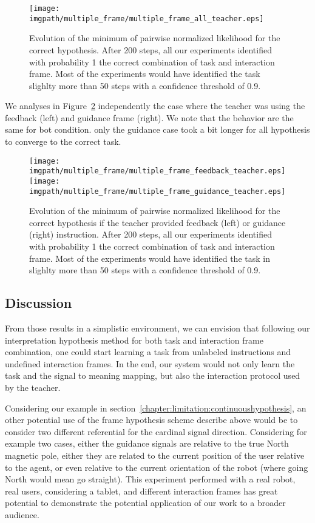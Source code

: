 \begin{figure}[!ht]
\centering
\texttt{[image: \\imgpath/multiple\_frame/multiple\_frame\_all\_teacher.eps]}
\caption{Evolution of the minimum of pairwise normalized likelihood for the correct hypothesis. After 200 steps, all our experiments identified with probability 1 the correct combination of task and interaction frame. Most of the experiments would have identified the task slighlty more than 50 steps with a confidence threshold of 0.9.}
\label{fig:multipleframeall}
\end{figure} 

We analyses in Figure~\ref{fig:multipleframefeedbackvsguidance} independently the case where the teacher was using the feedback (left) and guidance frame (right). We note that the behavior are the same for bot condition. only the guidance case took a bit longer for all hypothesis to converge to the correct task.

\begin{figure}[!ht]
\centering
\texttt{[image: \\imgpath/multiple\_frame/multiple\_frame\_feedback\_teacher.eps]}
\texttt{[image: \\imgpath/multiple\_frame/multiple\_frame\_guidance\_teacher.eps]}
\caption{Evolution of the minimum of pairwise normalized likelihood for the correct hypothesis if the teacher provided feedback (left) or guidance (right) instruction. After 200 steps, all our experiments identified with probability 1 the correct combination of task and interaction frame. Most of the experiments would have identified the task in slighlty more than 50 steps with a confidence threshold of 0.9.}
\label{fig:multipleframefeedbackvsguidance}
\end{figure} 


\subsection{Discussion}

From those results in a simplistic environment, we can envision that following our interpretation hypothesis method for both task and interaction frame combination, one could start learning a task from unlabeled instructions and undefined interaction frames. In the end, our system would not only learn the task and the signal to meaning mapping, but also the interaction protocol used by the teacher.

Considering our example in section~\ref{chapter:limitation:continuoushypothesis}, an other potential use of the frame hypothesis scheme describe above would be to consider two different referential for the cardinal signal direction. Considering for example two cases, either the guidance signals are relative to the true North magnetic pole, either they are related to the current position of the user relative to the agent, or even relative to the current orientation of the robot (where going North would mean go straight). This experiment performed with a real robot, real users, considering a tablet, and different interaction frames has great potential to demonstrate the potential application of our work to a broader audience.

